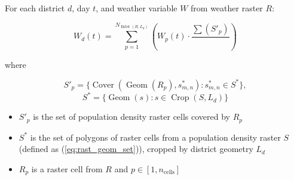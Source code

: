 \documentclass{article}
\begin{document}
For each district $d$, day $t$, and weather variable $W$ from weather raster $R$:

\begin{equation}
    W_d(t) = \sum_{p=1}^{N_{\operatorname{Inter}(R, L_d)}}\left( 
        W_p(t) \cdot \frac{\sum(S'_p)}{}
    \right)
\end{equation}

where

\begin{equation*}
    S'_p = \{ \operatorname{Cover}(\operatorname{Geom}(R_p), s^*_{m,n}) : s^*_{m,n} \in S^* \},
\end{equation*}
\begin{equation*}
    S^* = \{\operatorname{Geom}(s) : s \in \operatorname{Crop}(S,L_d)\}
\end{equation*}

\begin{itemize}
    \item $S'_p$ is the set of population density raster cells covered by $R_p$
    \item $S^*$ is the set of polygons of raster cells from a population density raster $S$  (defined as (\ref{eq:rast_geom_set})), cropped by district geometry $L_d$
    \item $R_p$ is a raster cell from $R$ and $p \in [1, n_\text{cells}]$

\end{itemize}

    
\end{document}
